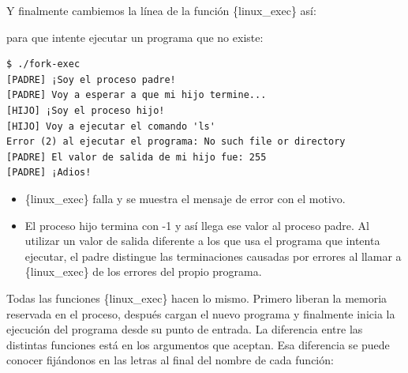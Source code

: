 Y finalmente cambiemos la línea de la función \{linux\_exec\} así:

\begin{Shaded}
\begin{Highlighting}[]
\OperatorTok{(} \OperatorTok{,} \OperatorTok{,} \OperatorTok{,}\OperatorTok{);}
\end{Highlighting}
\end{Shaded}

para que intente ejecutar un programa que no existe:

\begin{verbatim}
$ ./fork-exec
[PADRE] ¡Soy el proceso padre!
[PADRE] Voy a esperar a que mi hijo termine...
[HIJO] ¡Soy el proceso hijo!
[HIJO] Voy a ejecutar el comando 'ls'
Error (2) al ejecutar el programa: No such file or directory 
[PADRE] El valor de salida de mi hijo fue: 255 
[PADRE] ¡Adios!
\end{verbatim}

\begin{itemize}
\item
  \{linux\_exec\} falla y se muestra el mensaje de error con el motivo.
\item
  El proceso hijo termina con -1 y así llega ese valor al proceso padre.
  Al utilizar un valor de salida diferente a los que usa el programa que
  intenta ejecutar, el padre distingue las terminaciones causadas por
  errores al llamar a \{linux\_exec\} de los errores del propio
  programa.
\end{itemize}

Todas las funciones \{linux\_exec\} hacen lo mismo. Primero liberan la
memoria reservada en el proceso, después cargan el nuevo programa y
finalmente inicia la ejecución del programa desde su punto de entrada.
La diferencia entre las distintas funciones está en los argumentos que
aceptan. Esa diferencia se puede conocer fijándonos en las letras al
final del nombre de cada función:


